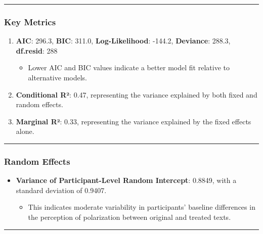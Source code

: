 \documentclass[
]{article}
\providecommand{\tightlist}{%
  \setlength{\itemsep}{0pt}\setlength{\parskip}{0pt}}
\begin{document}
\begin{center}\rule{0.5\linewidth}{0.5pt}\end{center}

\subsubsection{\texorpdfstring{\textbf{Key
Metrics}}{Key Metrics}}\label{key-metrics}

\begin{enumerate}
\def\labelenumi{\arabic{enumi}.}
\tightlist
\item
  \textbf{AIC}: 296.3, \textbf{BIC}: 311.0, \textbf{Log-Likelihood}:
  -144.2, \textbf{Deviance}: 288.3, \textbf{df.resid}: 288

  \begin{itemize}
  \tightlist
  \item
    Lower AIC and BIC values indicate a better model fit relative to
    alternative models.
  \end{itemize}
\item
  \textbf{Conditional R²}: 0.47, representing the variance explained by
  both fixed and random effects.
\item
  \textbf{Marginal R²}: 0.33, representing the variance explained by the
  fixed effects alone.
\end{enumerate}

\begin{center}\rule{0.5\linewidth}{0.5pt}\end{center}

\subsubsection{\texorpdfstring{\textbf{Random
Effects}}{Random Effects}}\label{random-effects}

\begin{itemize}
\tightlist
\item
  \textbf{Variance of Participant-Level Random Intercept}: 0.8849, with
  a standard deviation of 0.9407.

  \begin{itemize}
  \tightlist
  \item
    This indicates moderate variability in participants' baseline
    differences in the perception of polarization between original and
    treated texts.
  \end{itemize}
\end{itemize}

\begin{center}\rule{0.5\linewidth}{0.5pt}\end{center}
\end{document}
